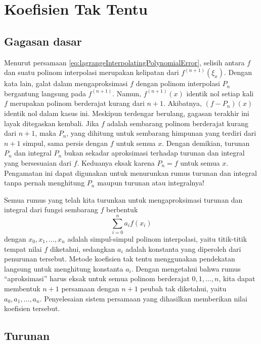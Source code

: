 
\section{\label{sec:UndeterminedCoefficients}Koefisien Tak Tentu}

\subsection{Gagasan dasar}

Menurut persamaan \ref{eq:lagrangeInterpolatingPolynomialError},
selisih antara $f$ dan suatu polinom interpolasi merupakan kelipatan
dari $f^{(n+1)}(\xi_{x})$. Dengan kata lain, galat dalam mengaproksimasi
$f$ dengan polinom interpolasi $P_{n}$ bergantung langsung pada
$f^{(n+1)}$. Namun, $f^{(n+1)}(x)$ identik nol setiap kali $f$
merupakan polinom berderajat kurang dari $n+1$. Akibatnya, $(f-P_{n})(x)$
identik nol dalam kasus ini. Meskipun terdengar berulang, gagasan
terakhir ini layak ditegaskan kembali. Jika $f$ adalah sembarang
polinom berderajat kurang dari $n+1$, maka $P_{n}$, yang dihitung
untuk sembarang himpunan yang terdiri dari $n+1$ simpul, sama persis
dengan $f$ untuk semua $x$. Dengan demikian, turunan $P_{n}$ dan
integral $P_{n}$ bukan sekadar aproksimasi terhadap turunan dan integral
yang bersesuaian dari $f$. Keduanya eksak karena $P_{n}=f$ untuk
semua $x$. Pengamatan ini dapat digunakan untuk menurunkan rumus
turunan dan integral tanpa pernah menghitung $P_{n}$ maupun turunan
atau integralnya!

Semua rumus yang telah kita turunkan untuk mengaproksimasi turunan
dan integral dari fungsi sembarang $f$ berbentuk
\[
\sum_{i=0}^{n}a_{i}f(x_{i})
\]
dengan $x_{0},x_{1},\ldots,x_{n}$ adalah simpul-simpul polinom interpolasi,
yaitu titik-titik tempat nilai $f$ diketahui, sedangkan $a_{i}$
adalah konstanta yang diperoleh dari penurunan tersebut. Metode koefisien
tak tentu menggunakan pendekatan langsung untuk menghitung konstanta
$a_{i}$. Dengan mengetahui bahwa rumus ``aproksimasi'' harus eksak
untuk semua polinom berderajat $0,1,\ldots,n$, kita dapat membentuk
$n+1$ persamaan dengan $n+1$ peubah tak diketahui, yaitu $a_{0},a_{1},\ldots,a_{n}$.
Penyelesaian sistem persamaan yang dihasilkan memberikan nilai koefisien
tersebut.

\subsection{Turunan}

